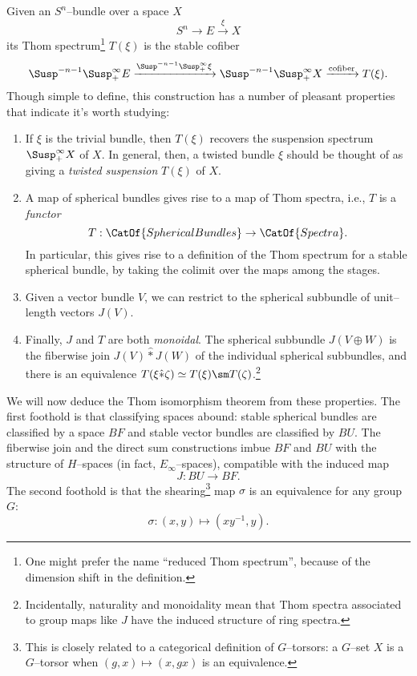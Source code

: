 Given an $S^n$--bundle over a space $X$ \[S^n \to E \xrightarrow\xi X\] its Thom spectrum\footnote{One might prefer the name ``reduced Thom spectrum'', because of the dimension shift in the definition.} $T(\xi)$ is the stable cofiber \[\Susp^{-n-1} \Susp^\infty_+ E \xrightarrow{\Susp^{-n-1} \Susp^\infty_+ \xi} \Susp^{-n-1} \Susp^\infty_+ X \xrightarrow{\text{cofiber}} T(\xi).\]  Though simple to define, this construction has a number of pleasant properties that indicate it's worth studying:
\begin{enumerate}
\item If $\xi$ is the trivial bundle, then $T(\xi)$ recovers the suspension spectrum $\Susp^\infty_+ X$ of $X$.  In general, then, a twisted bundle $\xi$ should be thought of as giving a \emph{twisted suspension} $T(\xi)$ of $X$.
\item A map of spherical bundles gives rise to a map of Thom spectra, i.e., $T$ is a \emph{functor} \[T: \CatOf{SphericalBundles} \to \CatOf{Spectra}.\]  In particular, this gives rise to a definition of the Thom spectrum for a stable spherical bundle, by taking the colimit over the maps among the stages.
\item Given a vector bundle $V$, we can restrict to the spherical subbundle of unit--length vectors $J(V)$.
\item Finally, $J$ and $T$ are both \emph{monoidal}.  The spherical subbundle $J(V \oplus W)$ is the fiberwise join $J(V) \hat\ast J(W)$ of the individual spherical subbundles, and there is an equivalence $T(\xi \hat\ast \zeta) \simeq T(\xi) \sm T(\zeta)$.\footnote{Incidentally, naturality and monoidality mean that Thom spectra associated to group maps like $J$ have the induced structure of ring spectra.}
\end{enumerate}

We will now deduce the Thom isomorphism theorem from these properties.  The first foothold is that classifying spaces abound: stable spherical bundles are classified by a space $BF$ and stable vector bundles are classified by $BU$.  The fiberwise join and the direct sum constructions imbue $BF$ and $BU$ with the structure of $H$--spaces (in fact, $E_\infty$--spaces), compatible with the induced map \[J: BU \to BF.\]  The second foothold is that the shearing\footnote{This is closely related to a categorical definition of $G$--torsors: a $G$--set $X$ is a $G$--torsor when $(g, x) \mapsto (x, gx)$ is an equivalence.} map $\sigma$ is an equivalence for any group $G$: \[\sigma: (x, y) \mapsto (x y^{-1}, y).\]

